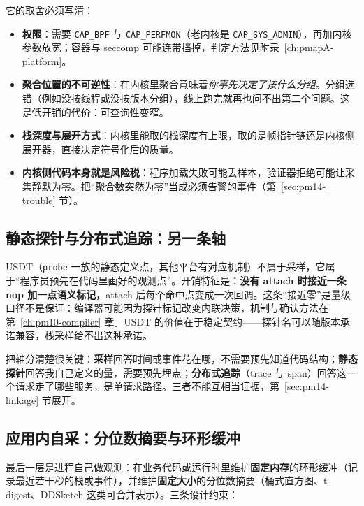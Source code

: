 \documentclass[12pt,a4paper,fontset=fandol]{ctexbook}
\newcommand{\Tp}[1]{\texttt{#1}}
\newcommand{\Bk}{\discretionary{}{}{}}
\begin{document}
它的取舍必须写清：
\begin{itemize}
  \item \textbf{权限}：需要 \Tp{CAP{\Bk}\_BPF} 与 \Tp{CAP{\Bk}\_PERFMON}（老内核是 \Tp{CAP{\Bk}\_SYS{\Bk}\_ADMIN}），再加内核参数放宽；容器与 seccomp 可能连带挡掉，判定方法见附录~\ref{ch:pmapA-platform}。
  \item \textbf{聚合位置的不可逆性}：在内核里聚合意味着\emph{你事先决定了按什么分组}。分组选错（例如没按线程或没按版本分组），线上跑完就再也问不出第二个问题。这是低开销的代价：可查询性变窄。
  \item \textbf{栈深度与展开方式}：内核里能取的栈深度有上限，取的是帧指针链还是内核侧展开器，直接决定符号化后的质量。
  \item \textbf{内核侧代码本身就是风险税}：程序加载失败可能丢样本，验证器拒绝可能让采集静默为零。把``聚合数突然为零''当成必须告警的事件（第~\ref{sec:pm14-trouble} 节）。
\end{itemize}

\subsection{静态探针与分布式追踪：另一条轴}
\label{sub:pm14-usdt}

USDT（\Tp{probe} 一族的静态定义点，其他平台有对应机制）不属于采样，它属于``程序员预先在代码里画好的观测点''。开销特征是：\textbf{没有 attach 时接近一条 nop 加一点语义标记}，attach 后每个命中点变成一次回调。这条``接近零''是量级口径不是保证：编译器可能因为探针标记改变内联决策，机制与确认方法在第~\ref{ch:pm10-compiler} 章。USDT 的价值在于稳定契约——探针名可以随版本承诺兼容，栈采样给不出这种承诺。

把轴分清楚很关键：\textbf{采样}回答时间或事件花在哪，不需要预先知道代码结构；\textbf{静态探针}回答我自己定义的量，需要预先埋点；\textbf{分布式追踪}（trace 与 span）回答这一个请求走了哪些服务，是单请求路径。三者不能互相当证据，第~\ref{sec:pm14-linkage} 节展开。

\subsection{应用内自采：分位数摘要与环形缓冲}
\label{sub:pm14-inproc}

最后一层是进程自己做观测：在业务代码或运行时里维护\textbf{固定内存}的环形缓冲（记录最近若干秒的栈或事件），并维护\textbf{固定大小}的分位数摘要（桶式直方图、t-digest、DDSketch 这类可合并表示）。三条设计约束：
\end{document}
